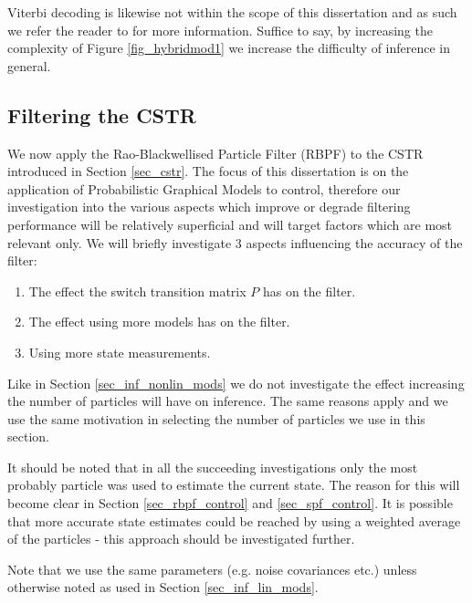 Viterbi decoding is likewise not within the scope of this dissertation and as such we refer the reader to \cite{murphy1} for more information. Suffice to say, by increasing the complexity of Figure \ref{fig_hybridmod1} we increase the difficulty of inference in general.

\subsection{Filtering the CSTR}
We now apply the Rao-Blackwellised Particle Filter (RBPF) to the CSTR introduced in Section \ref{sec_cstr}. The focus of this dissertation is on the application of Probabilistic Graphical Models to control, therefore our investigation into the various aspects which improve or degrade filtering performance will be relatively superficial and will target factors which are most relevant only. We will briefly investigate 3 aspects influencing the accuracy of the filter:
\begin{enumerate}
\item
The effect the switch transition matrix $P$ has on the filter.
\item
The effect using more models has on the filter.
\item
Using more state measurements.
\end{enumerate}
Like in Section \ref{sec_inf_nonlin_mods} we do not investigate the effect increasing the number of particles will have on inference. The same reasons apply and we use the same motivation in selecting the number of particles we use in this section.

It should be noted that in all the succeeding investigations only the most probably particle was used to estimate the current state. The reason for this will become clear in Section \ref{sec_rbpf_control} and \ref{sec_spf_control}. It is possible that more accurate state estimates could be reached by using a weighted average of the particles - this approach should be investigated further.

Note that we use the same parameters (e.g. noise covariances etc.) unless otherwise noted as used in Section \ref{sec_inf_lin_mods}.

